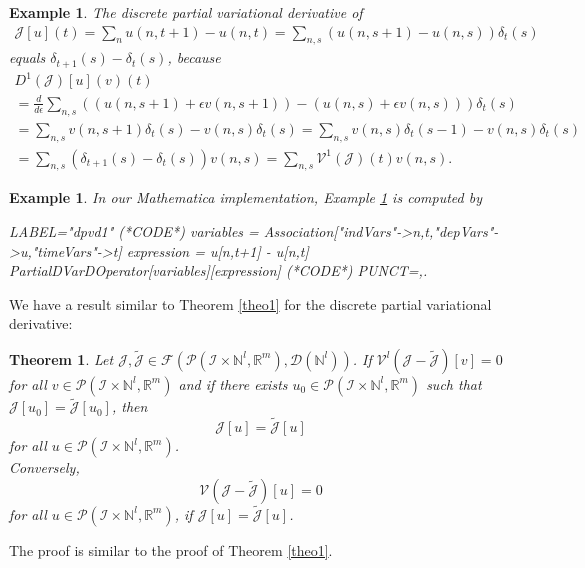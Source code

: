 \documentclass[sigconf,twocolumn]{acmart}
\newcommand{\Rr}{{\mathbb{R}}}
\newcommand{\Nn}{{\mathbb{N}}}
\newcommand{\1}{{\chi}}
\newcommand{\Ii}{{\mathcal{I}}}
\numberwithin{equation}{section}
\theoremstyle{thmlemcorr}
\numberwithin{theorem}{section}
\theoremstyle{thmlemcorr*}
\theoremstyle{defi}
\theoremstyle{remexample}
\newtheorem{example}[theorem]{Example}
\newtheorem{teo}[theorem]{Theorem}
\theoremstyle{ass}
\begin{document}
\begin{example}
	\label{dpvd1}
	The discrete partial variational derivative of 
	\begin{gather*}
		\mathcal{J}[u](t)=\sum_nu(n,t+1)-u(n,t)=\sum_{n,s}(u(n,s+1)-u(n,s))\delta_t(s)
	\end{gather*}
	equals $\delta_{t+1}(s)-\delta_t(s)$, because
	\small
	\begin{gather*}
		D^1(\mathcal{J})[u](v)(t)\\
		=\frac{d}{d\epsilon} \sum_{n,s}((u(n,s+1)+\epsilon v(n,s+1))-(u(n,s)+\epsilon v(n,s)))\delta_t(s)\\
		=\sum_{n,s}v(n,s+1)\delta_t(s)-v(n,s)\delta_t(s)=\sum_{n,s}v(n,s)\delta_t(s-1)-v(n,s)\delta_t(s)\\
		=\sum_{n,s}(\delta_{t+1}(s)-\delta_t(s))v(n,s)=\sum_{n,s}\mathcal{V}^1(\mathcal{J})(t)v(n,s).
	\end{gather*}
	\normalsize
\end{example}
\begin{example}
	In our {\sc Mathematica} implementation, Example \ref{dpvd1} is computed by
	\begin{EXE}
		LABEL="dpvd1"
		(*CODE*)
		variables = Association["indVars"->{n,t},"depVars"->{u},"timeVars"->{t}]
		expression = u[n,t+1] - u[n,t]
		PartialDVarDOperator[variables][expression]
		(*CODE*)
		PUNCT={,.}
	\end{EXE}	
	\begin{small}
		
		
	\end{small}
\end{example}
We have a result similar to Theorem \ref{theo1} for the discrete partial variational derivative:
\begin{teo}\label{theo2}
	Let $\mathcal{J},\tilde{\mathcal{J}}\in \mathcal{F}(\mathcal{P}(\Ii\times\Nn^l,\Rr^m),\mathcal{D}(\Nn^l))$. If $\mathcal{V}^l(\mathcal{J}-\tilde{\mathcal{J}})[v]=0$ for all $v\in\mathcal{P}(\Ii\times\Nn^l,\Rr^m)$ and if there exists $u_0\in\mathcal{P}(\Ii\times\Nn^l,\Rr^m)$ such that $\mathcal{J}[u_0]=\tilde{\mathcal{J}}[u_0]$, then
	\begin{equation*}
		\mathcal{J}[u]=\tilde{\mathcal{J}}[u]
	\end{equation*}
	for all $u\in\mathcal{P}(\Ii\times\Nn^l,\Rr^m)$.\\
	Conversely,
	\begin{equation*}
		\mathcal{V}(\mathcal{J}-\tilde{\mathcal{J}})[u]=0
	\end{equation*}
	for all $u\in\mathcal{P}(\Ii\times\Nn^l,\Rr^m)$, if $\mathcal{J}[u]=\tilde{\mathcal{J}}[u]$.
\end{teo}
The proof is similar to the proof of Theorem \ref{theo1}.
\end{document}

